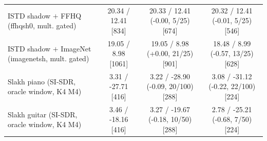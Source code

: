 \begin{table}[t]
\begin{tabular}{@{}lccc@{}}
        ISTD shadow $+$ FFHQ (ffhqsh0, mult. gated) & 20.34 / 12.41 [834] & 20.33 / 12.41 (-0.00, 5/25) [674] & 20.32 / 12.41 (-0.01, 5/25) [546] \\
        ISTD shadow $+$ ImageNet (imagenetsh, mult. gated) & 19.05 / 8.98 [1061] & 19.05 / 8.98 (+0.00, 21/25) [901] & 18.48 / 8.99 (-0.57, 13/25) [628] \\
        Slakh piano (SI-SDR, oracle window, K4 M4) & 3.31 / -27.71 [416] & 3.22 / -28.90 (-0.09, 20/100) [288] & 3.08 / -31.12 (-0.22, 22/100) [224] \\
        Slakh guitar (SI-SDR, oracle window, K4 M4) & 3.46 / -18.16 [416] & 3.27 / -19.67 (-0.18, 10/50) [288] & 2.78 / -25.21 (-0.68, 7/50) [224] \\
        \bottomrule
    \end{tabular}
\end{table}
